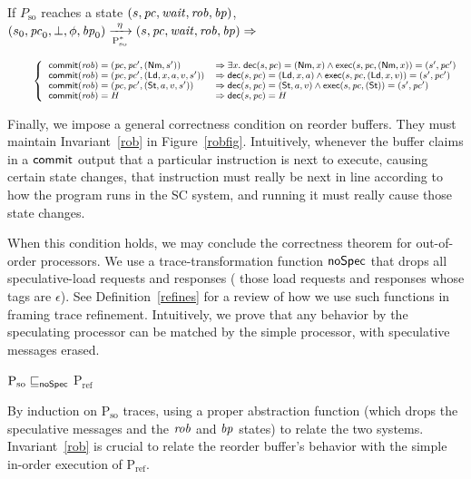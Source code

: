 \begin{figure*}[t]
\begin{inv}
If $P_\text{so}$ reaches a state $(s, \pc, \wait, \rob, \ppc)$, \ie{}\hspace{.2cm}
$\io{P$_\text{so}^{*}$}{s_0,\pc_0,\bot,\phi,\ppc_0}{s,\pc,\wait,\rob,\ppc}{\eta} \Rightarrow$

\begin{math}
\small
\;\;\;\;\;\;\;\;\left\{
\begin{array}{ll}
\commit(\rob) = (\pc, \pc', (\nm, s')) &\Rightarrow
\exists x. \; \dec(s,\pc) = (\nm, x) \wedge \exec(s,\pc, (\nm,x)) =
(s',\pc')\\
\commit(\rob) = (\pc, \pc', (\ld, x, a, v, s')) & \Rightarrow
\dec(s,\pc) = (\ld, x,a) \wedge \exec(s,\pc, (\ld,x,v)) = (s',\pc')\\
\commit(\rob) = (\pc, \pc', (\st, a, v, s')) &\Rightarrow
\dec(s,\pc) = (\st, a,v) \wedge \exec(s,\pc, (\st)) =
(s',\pc')\\
\commit(\rob) = H & \Rightarrow
\dec(s, \pc) = H\\
\end{array}
\right.\end{math}
\label{rob}
\end{inv}
\vspace{-.5cm}
\caption{Correctness of reorder buffer}
\label{robfig}
\end{figure*}

Finally, we impose a general correctness condition on reorder
buffers.  They must maintain Invariant~\ref{rob} in Figure~\ref{robfig}.
Intuitively, whenever the buffer claims in a $\commit$
output that a particular instruction is next to execute, causing
certain state changes, that instruction must really be next in line according
to how the program runs in the SC system, and running it must really cause
those state changes.

When this condition holds, we may conclude the correctness theorem for
out-of-order processors.  We use a trace-transformation function
$\noSpec$ that drops all speculative-load requests and responses (\ie{} those load requests and responses whose tags are $\epsilon$).
See Definition~\ref{refines} for a review of how we use such
functions in framing trace refinement.  Intuitively, we prove that any
behavior by the speculating processor can be matched by the simple
processor, with speculative messages erased.
\begin{theorem}
\label{ocorrect}
$\text{P$_\text{so}$} \sqsubseteq_\noSpec$ P$_\text{ref}$
\end{theorem}
\begin{prf}
By induction on P$_\text{so}$ traces, using a proper abstraction
function (which drops the speculative messages and the $\rob$ and $\ppc$ states) to relate the two systems.  Invariant~\ref{rob} is crucial to
relate the reorder buffer's behavior with the simple in-order
execution of P$_\text{ref}$.
\end{prf}

